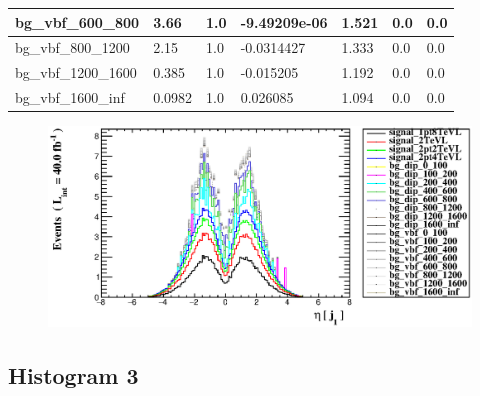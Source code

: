 \documentclass[a4paper, 10pt]{article}
\begin{document}
\begin{table}[H]
\begin{center}
\begin{tabular}{|m{23.0mm}|m{23.0mm}|m{18.0mm}|m{19.0mm}|m{19.0mm}|m{19.0mm}|m{19.0mm}|}
      \hline
      {\cellcolor{white}         bg\_vbf\_600\_800}& {\cellcolor{white}         3.66}& {\cellcolor{white}         1.0}& {\cellcolor{white}         -9.49209e-06}& {\cellcolor{white}         1.521}& {\cellcolor{green}         0.0}& {\cellcolor{green}         0.0}\\
      \hline
      {\cellcolor{white}         bg\_vbf\_800\_1200}& {\cellcolor{white}         2.15}& {\cellcolor{white}         1.0}& {\cellcolor{white}         -0.0314427}& {\cellcolor{white}         1.333}& {\cellcolor{green}         0.0}& {\cellcolor{green}         0.0}\\
      \hline
      {\cellcolor{white}         bg\_vbf\_1200\_1600}& {\cellcolor{white}         0.385}& {\cellcolor{white}         1.0}& {\cellcolor{white}         -0.015205}& {\cellcolor{white}         1.192}& {\cellcolor{green}         0.0}& {\cellcolor{green}         0.0}\\
      \hline
      {\cellcolor{white}         bg\_vbf\_1600\_inf}& {\cellcolor{white}         0.0982}& {\cellcolor{white}         1.0}& {\cellcolor{white}         0.026085}& {\cellcolor{white}         1.094}& {\cellcolor{green}         0.0}& {\cellcolor{green}         0.0}\\
\hline
    \end{tabular}
  \end{center}
\end{table}

\begin{figure}[H]
  \begin{center}
    \includegraphics[scale=0.45]{selection_1.eps}\\
\caption{   }
  \end{center}
\end{figure}
      \newpage
\subsection{ Histogram 3}
\end{document}
